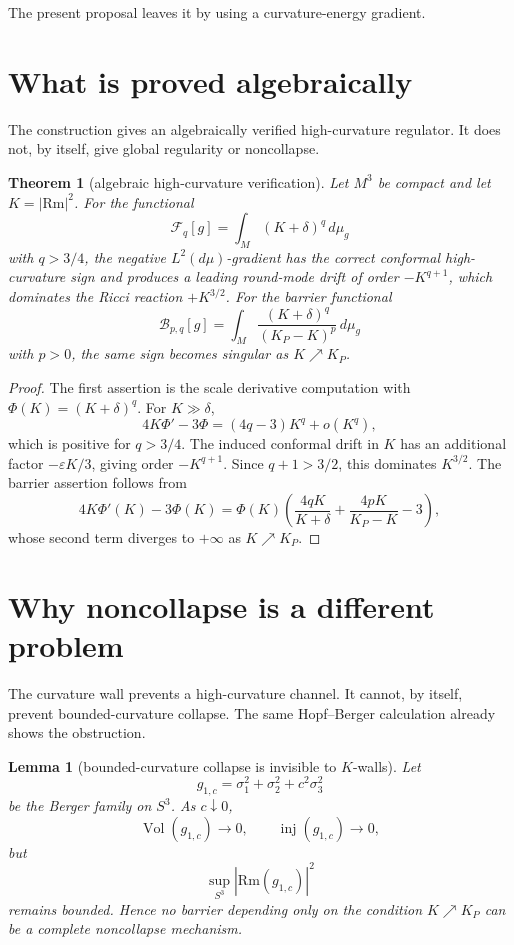\documentclass[11pt]{amsart}
\newtheorem{theorem}{Theorem}
\newtheorem{lemma}{Lemma}
\newcommand{\Rm}{\mathrm{Rm}}
\newcommand{\KP}{K_{\!P}}
\newcommand{\F}{\mathcal F}
\newcommand{\B}{\mathcal B}
\newcommand{\Vol}{\operatorname{Vol}}
\newcommand{\inj}{\operatorname{inj}}
\begin{document}
The present proposal leaves it by using a curvature-energy gradient.

\section{What is proved algebraically}

The construction gives an algebraically verified high-curvature regulator.
It does not, by itself, give global regularity or noncollapse.

\begin{theorem}[algebraic high-curvature verification]\label{thm:algebraic-verification}
Let \(M^3\) be compact and let \(K=|\Rm|^2\).  For the functional
\[
        \F_q[g]=\int_M (K+\delta)^q\,d\mu_g
\]
with \(q>3/4\), the negative \(L^2(d\mu)\)-gradient has the correct conformal
high-curvature sign and produces a leading round-mode drift of order
\(-K^{q+1}\), which dominates the Ricci reaction \(+K^{3/2}\).  For the
barrier functional
\[
        \B_{p,q}[g]
        =
        \int_M
        \frac{(K+\delta)^q}{(\KP-K)^p}\,d\mu_g
\]
with \(p>0\), the same sign becomes singular as \(K\nearrow\KP\).
\end{theorem}

\begin{proof}
The first assertion is the scale derivative computation with
\(\Phi(K)=(K+\delta)^q\).  For \(K\gg\delta\),
\[
        4K\Phi'-3\Phi
        =
        (4q-3)K^q+o(K^q),
\]
which is positive for \(q>3/4\).  The induced conformal drift in \(K\) has an
additional factor \(-\varepsilon K/3\), giving order \(-K^{q+1}\).  Since
\(q+1>3/2\), this dominates \(K^{3/2}\).  The barrier assertion follows from
\[
        4K\Phi'(K)-3\Phi(K)
        =
        \Phi(K)
        \left(
        \frac{4qK}{K+\delta}
        +
        \frac{4pK}{\KP-K}
        -3
        \right),
\]
whose second term diverges to \(+\infty\) as \(K\nearrow\KP\).
\end{proof}

\section{Why noncollapse is a different problem}

The curvature wall prevents a high-curvature channel.  It cannot, by itself,
prevent bounded-curvature collapse.  The same Hopf--Berger calculation already
shows the obstruction.

\begin{lemma}[bounded-curvature collapse is invisible to \(K\)-walls]\label{lem:hopf-collapse-obstruction}
Let
\[
        g_{1,c}=\sigma_1^2+\sigma_2^2+c^2\sigma_3^2
\]
be the Berger family on \(S^3\).  As \(c\downarrow0\),
\[
        \Vol(g_{1,c})\to0,\qquad \inj(g_{1,c})\to0,
\]
but
\[
        \sup_{S^3}|\Rm(g_{1,c})|^2
\]
remains bounded.  Hence no barrier depending only on the condition
\(K\nearrow\KP\) can be a complete noncollapse mechanism.
\end{lemma}
\end{document}
